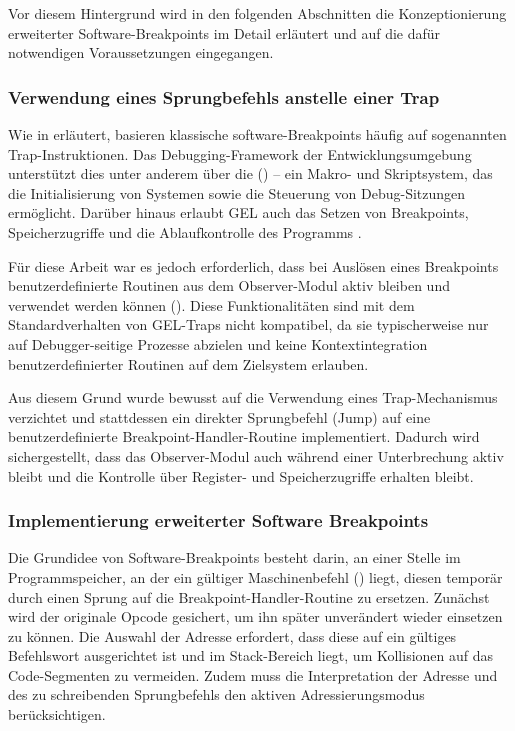 Vor diesem Hintergrund wird in den folgenden Abschnitten die Konzeptionierung erweiterter Software-Breakpoints im Detail erl\"autert und auf die daf\"ur notwendigen Voraussetzungen eingegangen.


\newpage
\subsubsection{Verwendung eines Sprungbefehls anstelle einer Trap}
\label{sec:JumpVsTrap}

Wie in  erl\"autert, basieren klassische software-Breakpoints h\"aufig auf sogenannten Trap-Instruktionen. Das Debugging-Framework der Entwicklungsumgebung unterst\"utzt dies unter anderem \"uber die  () – ein Makro- und Skriptsystem, das die Initialisierung von Systemen sowie die Steuerung von Debug-Sitzungen erm\"oglicht. Dar\"uber hinaus erlaubt GEL auch das Setzen von Breakpoints, Speicherzugriffe und die Ablaufkontrolle des Programms .

F\"ur diese Arbeit war es jedoch erforderlich, dass bei Ausl\"osen eines Breakpoints benutzerdefinierte Routinen aus dem Observer-Modul aktiv bleiben und verwendet werden k\"onnen (\Vgl {}). Diese Funktionalit\"aten sind mit dem Standardverhalten von GEL-Traps nicht kompatibel, da sie typischerweise nur auf Debugger-seitige Prozesse abzielen und keine Kontextintegration benutzerdefinierter Routinen auf dem Zielsystem erlauben.

Aus diesem Grund wurde bewusst auf die Verwendung eines Trap-Mechanismus verzichtet und stattdessen ein direkter Sprungbefehl (Jump) auf eine benutzerdefinierte Breakpoint-Handler-Routine implementiert. Dadurch wird sichergestellt, dass das Observer-Modul auch w\"ahrend einer Unterbrechung aktiv bleibt und die Kontrolle \"uber Register- und Speicherzugriffe erhalten bleibt.



\subsubsection{Implementierung erweiterter Software Breakpoints}
\label{sec:ImplementierungSoftwareBreakpoints}

Die Grundidee von Software-Breakpoints besteht darin, an einer Stelle im Programmspeicher, an der ein g\"ultiger Maschinenbefehl () liegt, diesen tempor\"ar durch einen Sprung auf die Breakpoint-Handler-Routine zu ersetzen. Zun\"achst wird der originale Opcode gesichert, um ihn sp\"ater unver\"andert wieder einsetzen zu k\"onnen. Die Auswahl der Adresse erfordert, dass diese auf ein g\"ultiges Befehlswort ausgerichtet ist und im Stack-Bereich liegt, um Kollisionen auf das Code-Segmenten zu vermeiden. Zudem muss die Interpretation der Adresse und des zu schreibenden Sprungbefehls den aktiven Adressierungsmodus ber\"ucksichtigen.

